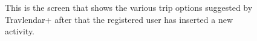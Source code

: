\documentclass[12pt,titlepage]{article}
\begin{document}
\begin{figure}
\centering
{}
\caption{This is the screen that shows the various trip options suggested by Travlendar+ after that the registered user has inserted a new activity. }
\end{figure}
\clearpage
\newpage
\end{document}
